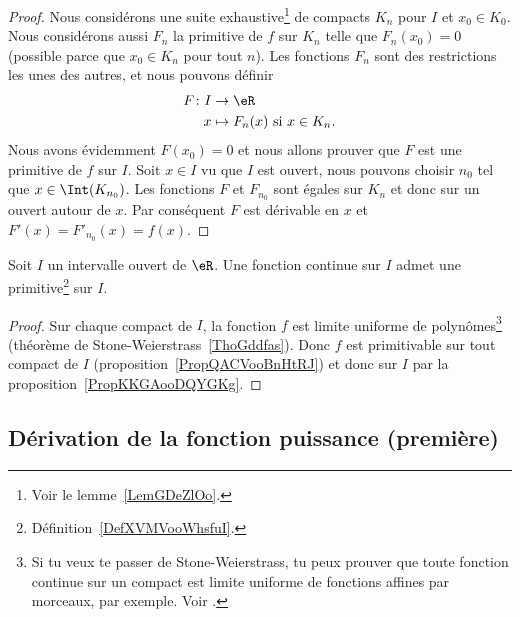 \begin{proof}
	Nous considérons une suite exhaustive\footnote{Voir le lemme~\ref{LemGDeZlOo}.} de compacts \( K_n\) pour \( I\) et \( x_0\in K_0\). Nous considérons aussi \( F_n\) la primitive de \( f\) sur \( K_n\) telle que \( F_n(x_0)=0\) (possible parce que \( x_0\in K_n\) pour tout \( n\)). Les fonctions \( F_n\) sont des restrictions les unes des autres, et nous pouvons définir
	\begin{equation}
		\begin{aligned}
			F\colon I & \to \eR                             \\
			x         & \mapsto F_n(x)\text{ si } x\in K_n.
		\end{aligned}
	\end{equation}
	Nous avons évidemment \( F(x_0)=0\) et nous allons prouver que \( F\) est une primitive de \( f\) sur \( I\). Soit \( x\in I\) vu que \( I\) est ouvert, nous pouvons choisir \( n_0\) tel que \( x\in\Int(K_{n_0})\). Les fonctions \( F\) et \( F_{n_0}\) sont égales sur \( K_n\) et donc sur un ouvert autour de \( x\). Par conséquent \( F\) est dérivable en \( x\) et \( F'(x)=F'_{n_0}(x)=f(x)\).
\end{proof}

\begin{theorem}    \label{ThoEXXyooCLwgQg}
	Soit \( I\) un intervalle ouvert de \( \eR\). Une fonction continue sur \( I\) admet une primitive\footnote{Définition~\ref{DefXVMVooWhsfuI}.} sur \( I\).
\end{theorem}

\begin{proof}
	Sur chaque compact de \( I\), la fonction \( f\) est limite uniforme de polynômes\footnote{Si tu veux te passer de Stone-Weierstrass, tu peux prouver que toute fonction continue sur un compact est limite uniforme de fonctions affines par morceaux, par exemple. Voir \cite{MQKDooSuEGxk}.} (théorème de Stone-Weierstrass~\ref{ThoGddfas}). Donc \( f\) est primitivable sur tout compact de \( I\) (proposition~\ref{PropQACVooBnHtRJ}) et donc sur \( I\) par la proposition~\ref{PropKKGAooDQYGKg}.
\end{proof}


\subsection{Dérivation de la fonction puissance (première)}

